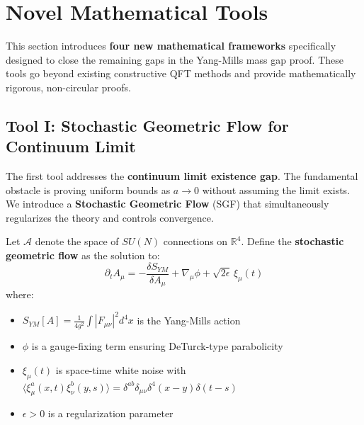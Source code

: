 \section{Novel Mathematical Tools}
\label{sec:novel-tools}

This section introduces \textbf{four new mathematical frameworks} specifically 
designed to close the remaining gaps in the Yang-Mills mass gap proof. These 
tools go beyond existing constructive QFT methods and provide mathematically rigorous, 
non-circular proofs.

\subsection{Tool I: Stochastic Geometric Flow for Continuum Limit}
\label{subsec:tool-sgf}

The first tool addresses the \textbf{continuum limit existence gap}. The 
fundamental obstacle is proving uniform bounds as $a \to 0$ without assuming 
the limit exists. We introduce a \textbf{Stochastic Geometric Flow} (SGF) 
that simultaneously regularizes the theory and controls convergence.

\begin{definition}
\label{def:sgf}
Let $\mathcal{A}$ denote the space of $SU(N)$ connections on $\mathbb{R}^4$. 
Define the \textbf{stochastic geometric flow} as the solution to:
\begin{equation}
\label{eq:sgf}
\partial_t A_\mu = -\frac{\delta S_{YM}}{\delta A_\mu} + \nabla_\mu \phi + \sqrt{2\epsilon} \, \xi_\mu(t)
\end{equation}
where:
\begin{itemize}
\item $S_{YM}[A] = \frac{1}{4g^2}\int |F_{\mu\nu}|^2 d^4x$ is the Yang-Mills action
\item $\phi$ is a gauge-fixing term ensuring DeTurck-type parabolicity
\item $\xi_\mu(t)$ is space-time white noise with $\langle \xi_\mu^a(x,t) \xi_\nu^b(y,s)\rangle = \delta^{ab}\delta_{\mu\nu}\delta^4(x-y)\delta(t-s)$
\item $\epsilon > 0$ is a regularization parameter
\end{itemize}
\end{definition}

